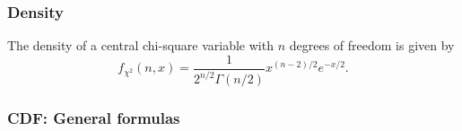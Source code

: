 %
%









\subsubsection{Density}
\label{ChiSquareDistributionDensity}
The density of a central chi-square variable with $n$ degrees of freedom is given by
\begin{equation}
	f_{\chi^2}(n, x)  = \frac{1}{2^{n/2} \Gamma(n/2)} x^{(n-2)/2}e^{-x/2}.
\end{equation}

\subsubsection{CDF: General formulas}
\label{sec:ChiSquareDistribution_cdf}

